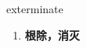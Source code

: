 
\begin{frame}
{\huge exterminate}
\begin{center}
\begin{enumerate}\Large
  \item \textbf{根除，消灭}
\end{enumerate}
\end{center}
\end{frame}
